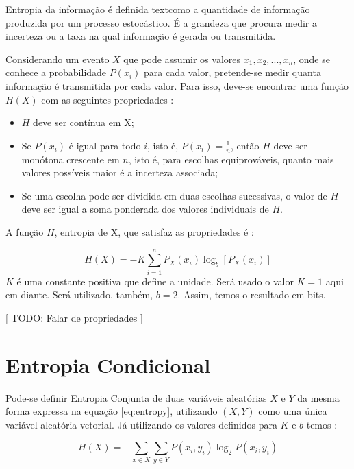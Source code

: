 Entropia da informação é definida textcomo a quantidade de informação produzida por um processo estocástico. É a grandeza que procura medir a incerteza ou a taxa na qual informação é gerada ou transmitida.

Considerando um evento $X$ que pode assumir os valores ${x_1, x_2, ..., x_n}$, onde se conhece a probabilidade $P(x_i)$ para cada valor, pretende-se medir quanta informação é transmitida por cada valor. Para isso, deve-se encontrar uma função $H(X)$ com as seguintes propriedades \cite{shannon}:

\begin{itemize}
    \item $H$ deve ser contínua em X;
    \item Se $P(x_i)$ é igual para todo $i$, isto é, $P(x_i) = \frac{1}{n}$, então $H$ deve ser monótona crescente em $n$, isto é, para escolhas equiprováveis, quanto mais valores possíveis maior é a incerteza associada;
    \item Se uma escolha pode ser dividida em duas escolhas sucessivas, o valor de $H$ deve ser igual a soma ponderada dos valores individuais de $H$. 
\end{itemize}

A função $H$, entropia de X, que satisfaz as propriedades é \cite{shannon}:

\begin{equation}
    H(X) = - K \sum_{i=1}^{n} P_X(x_i) \log_b{[P_X(x_i)]}
\label{eq:entropy}
\end{equation}
$K$ é uma constante positiva que define a unidade. Será usado o valor $K=1$ aqui em diante. Será utilizado, também, $b=2$. Assim, temos o resultado em bits.

[ TODO: Falar de propriedades ]

\section{Entropia Condicional}

Pode-se definir Entropia Conjunta de duas variáveis aleatórias $X$ e $Y$ da mesma forma expressa na equação \ref{eq:entropy}, utilizando $(X, Y)$ como uma única variável aleatória vetorial. Já utilizando os valores definidos para $K$ e $b$ temos \cite{livro}:

\begin{equation}
    H(X) = - \sum_{x \in X}\sum_{y \in Y} P(x_i, y_i) \log_2{P(x_i, y_i)}
\label{eq:joint_entropy}
\end{equation}

